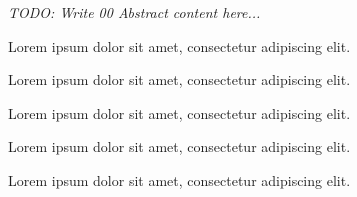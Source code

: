 \textit{TODO: Write 00 Abstract content here...}
\par Lorem ipsum dolor sit amet, consectetur adipiscing elit. \par Lorem ipsum dolor sit amet, consectetur adipiscing elit. \par Lorem ipsum dolor sit amet, consectetur adipiscing elit. \par Lorem ipsum dolor sit amet, consectetur adipiscing elit. \par Lorem ipsum dolor sit amet, consectetur adipiscing elit. 
